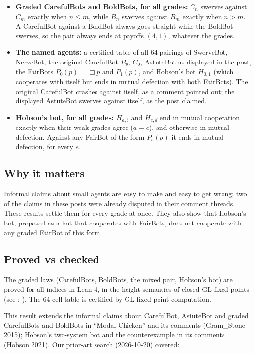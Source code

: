 \documentclass{article}
\begin{document}
\begin{itemize}
\item \textbf{Graded CarefulBots and BoldBots, for all grades:} $C_n$ swerves against $C_m$ exactly when $n \le m$, while $B_n$ swerves against $B_m$ exactly when $n > m$. A CarefulBot against a BoldBot always goes straight while the BoldBot swerves, so the pair always ends at payoffs $(4, 1)$, whatever the grades.
\item \textbf{The named agents:} a certified table of all 64 pairings of SwerveBot, NerveBot, the original CarefulBot $B_0$, $C_0$, AstuteBot as displayed in the post, the FairBots $P_0(p) = \Box p$ and $P_1(p)$, and Hobson's bot $H_{0,1}$ (which cooperates with itself but ends in mutual defection with both FairBots). The original CarefulBot crashes against itself, as a comment pointed out; the displayed AstuteBot swerves against itself, as the post claimed.
\item \textbf{Hobson's bot, for all grades:} $H_{a,b}$ and $H_{c,d}$ end in mutual cooperation exactly when their weak grades agree ($a = c$), and otherwise in mutual defection. Against any FairBot of the form $P_e(p)$ it ends in mutual defection, for every $e$.
\end{itemize}

\subsection*{Why it matters}

Informal claims about small agents are easy to make and easy to get wrong; two of the claims in
these posts were already disputed in their comment threads. These results settle them for every
grade at once. They also show that Hobson's bot, proposed as a bot that cooperates with FairBots,
does not cooperate with any graded FairBot of this form.

\subsection*{Proved vs checked}

The graded laws (CarefulBots, BoldBots, the mixed pair, Hobson's bot) are proved for all indices in
Lean 4, in the height semantics of closed GL fixed points (see \cite{boolos1993logic};
\cite{solovay1976provability}). The 64-cell table is certified by GL fixed-point computation.

This result extends the informal claims about CarefulBot, AstuteBot and graded CarefulBots and BoldBots in ``Modal Chicken'' and its comments (Gram\_Stone 2015); Hobson's two-system bot and the counterexample in its comments (Hobson 2021). Our prior-art search (2026-10-20) covered:
\end{document}
